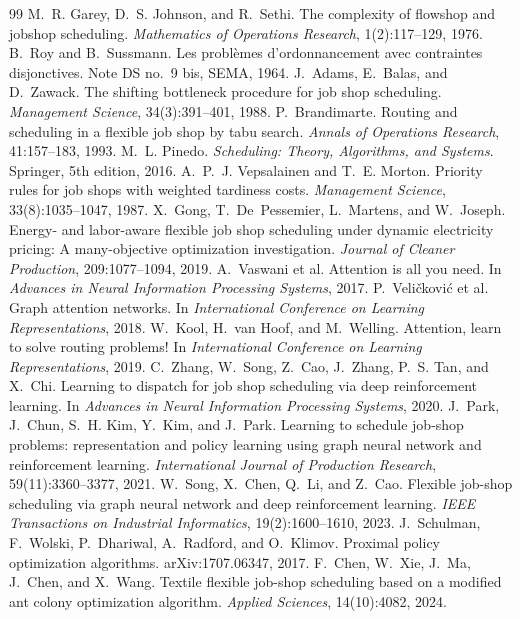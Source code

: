 \documentclass[10pt,a4paper]{article}
\begin{document}
\begin{thebibliography}{99}
 M.~R. Garey, D.~S. Johnson, and R.~Sethi. The complexity of flowshop and jobshop scheduling. \emph{Mathematics of Operations Research}, 1(2):117--129, 1976.
 B.~Roy and B.~Sussmann. Les probl\`emes d'ordonnancement avec contraintes disjonctives. Note DS no.~9 bis, SEMA, 1964.
 J.~Adams, E.~Balas, and D.~Zawack. The shifting bottleneck procedure for job shop scheduling. \emph{Management Science}, 34(3):391--401, 1988.
 P.~Brandimarte. Routing and scheduling in a flexible job shop by tabu search. \emph{Annals of Operations Research}, 41:157--183, 1993.
 M.~L. Pinedo. \emph{Scheduling: Theory, Algorithms, and Systems}. Springer, 5th edition, 2016.
 A.~P.~J. Vepsalainen and T.~E. Morton. Priority rules for job shops with weighted tardiness costs. \emph{Management Science}, 33(8):1035--1047, 1987.
 X.~Gong, T.~De~Pessemier, L.~Martens, and W.~Joseph. Energy- and labor-aware flexible job shop scheduling under dynamic electricity pricing: A many-objective optimization investigation. \emph{Journal of Cleaner Production}, 209:1077--1094, 2019.
 A.~Vaswani et al. Attention is all you need. In \emph{Advances in Neural Information Processing Systems}, 2017.
 P.~Veli{\v c}kovi{\'c} et al. Graph attention networks. In \emph{International Conference on Learning Representations}, 2018.
 W.~Kool, H.~van Hoof, and M.~Welling. Attention, learn to solve routing problems! In \emph{International Conference on Learning Representations}, 2019.
 C.~Zhang, W.~Song, Z.~Cao, J.~Zhang, P.~S. Tan, and X.~Chi. Learning to dispatch for job shop scheduling via deep reinforcement learning. In \emph{Advances in Neural Information Processing Systems}, 2020.
 J.~Park, J.~Chun, S.~H. Kim, Y.~Kim, and J.~Park. Learning to schedule job-shop problems: representation and policy learning using graph neural network and reinforcement learning. \emph{International Journal of Production Research}, 59(11):3360--3377, 2021.
 W.~Song, X.~Chen, Q.~Li, and Z.~Cao. Flexible job-shop scheduling via graph neural network and deep reinforcement learning. \emph{IEEE Transactions on Industrial Informatics}, 19(2):1600--1610, 2023.
 J.~Schulman, F.~Wolski, P.~Dhariwal, A.~Radford, and O.~Klimov. Proximal policy optimization algorithms. arXiv:1707.06347, 2017.
 F.~Chen, W.~Xie, J.~Ma, J.~Chen, and X.~Wang. Textile flexible job-shop scheduling based on a modified ant colony optimization algorithm. \emph{Applied Sciences}, 14(10):4082, 2024.
\end{thebibliography}
\end{document}
